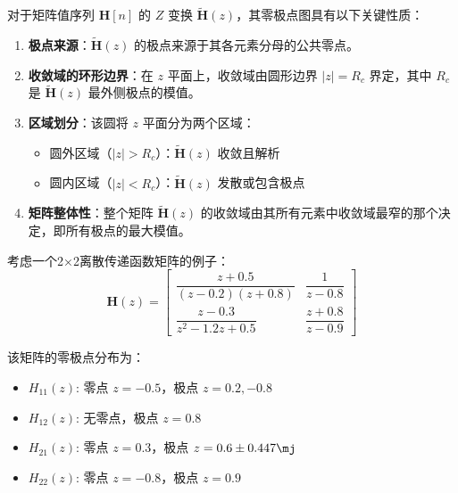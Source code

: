 \begin{remark}
    对于矩阵值序列 $\mathbf{H}[n]$ 的 $Z$ 变换 $\tilde{\mathbf{H}}(z)$，其零极点图具有以下关键性质：

    \begin{enumerate}
        \item \textbf{极点来源}：$\tilde{\mathbf{H}}(z)$ 的极点来源于其各元素分母的公共零点。

        \item \textbf{收敛域的环形边界}：在 $z$ 平面上，收敛域由圆形边界 $|z| = R_c$ 界定，其中 $R_c$ 是 $\tilde{\mathbf{H}}(z)$ 最外侧极点的模值。

        \item \textbf{区域划分}：该圆将 $z$ 平面分为两个区域：
              \begin{itemize}
                  \item 圆外区域（$|z| > R_c$）：$\tilde{\mathbf{H}}(z)$ 收敛且解析
                  \item 圆内区域（$|z| < R_c$）：$\tilde{\mathbf{H}}(z)$ 发散或包含极点
              \end{itemize}


        \item \textbf{矩阵整体性}：整个矩阵 $\tilde{\mathbf{H}}(z)$ 的收敛域由其所有元素中收敛域最窄的那个决定，即所有极点的最大模值。
    \end{enumerate}
\end{remark}

考虑一个2×2离散传递函数矩阵的例子：
\[
    \mathbf{H}(z) = \begin{bmatrix}
        \dfrac{z+0.5}{(z-0.2)(z+0.8)}   & \dfrac{1}{z-0.8}     \\[1em]
        \dfrac{z-0.3}{z^2 - 1.2z + 0.5} & \dfrac{z+0.8}{z-0.9}
    \end{bmatrix}
\]

该矩阵的零极点分布为：
\begin{itemize}
    \item $H_{11}(z)$: 零点 $z = -0.5$，极点 $z = 0.2, -0.8$
    \item $H_{12}(z)$: 无零点，极点 $z = 0.8$
    \item $H_{21}(z)$: 零点 $z = 0.3$，极点 $z = 0.6 \pm 0.447\mj$
    \item $H_{22}(z)$: 零点 $z = -0.8$，极点 $z = 0.9$
\end{itemize}

